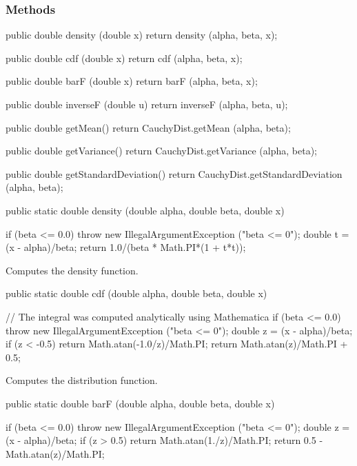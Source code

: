 \subsubsection* {Methods}
\begin{code}\begin{hide}

   public double density (double x) {
      return density (alpha, beta, x);
   }

   public double cdf (double x) {
      return cdf (alpha, beta, x);
   }

   public double barF (double x) {
      return barF (alpha, beta, x);
   }

   public double inverseF (double u){
      return inverseF (alpha, beta, u);
   }

   public double getMean() {
      return CauchyDist.getMean (alpha, beta);
   }

   public double getVariance() {
      return CauchyDist.getVariance (alpha, beta);
   }

   public double getStandardDeviation() {
      return CauchyDist.getStandardDeviation (alpha, beta);
   }\end{hide}

   public static double density (double alpha, double beta, double x)\begin{hide} {
      if (beta <= 0.0)
         throw new IllegalArgumentException ("beta <= 0");
      double t = (x - alpha)/beta;
      return 1.0/(beta * Math.PI*(1 + t*t));
   }\end{hide}
\end{code}
\begin{tabb} Computes the density function.
\end{tabb}
\begin{code}

   public static double cdf (double alpha, double beta, double x)\begin{hide} {
      // The integral was computed analytically using Mathematica
      if (beta <= 0.0)
         throw new IllegalArgumentException ("beta <= 0");
      double z = (x - alpha)/beta;
      if (z < -0.5)
         return Math.atan(-1.0/z)/Math.PI;
      return Math.atan(z)/Math.PI + 0.5;
   }\end{hide}
\end{code}
 \begin{tabb}
  Computes the  distribution function.
 \end{tabb}
\begin{code}

   public static double barF (double alpha, double beta, double x)\begin{hide} {
      if (beta <= 0.0)
         throw new IllegalArgumentException ("beta <= 0");
      double z = (x - alpha)/beta;
      if (z > 0.5)
         return Math.atan(1./z)/Math.PI;
      return 0.5 - Math.atan(z)/Math.PI;
   }\end{hide}
\end{code}
